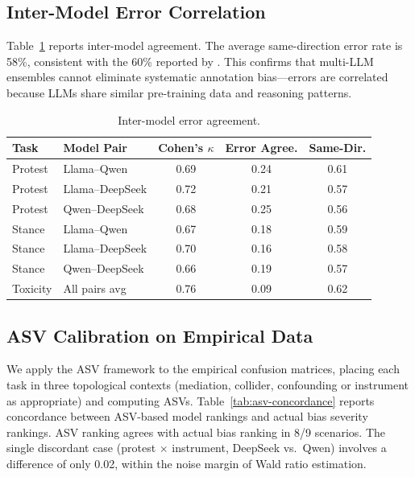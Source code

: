 \documentclass[11pt]{article}
\begin{document}
\subsection{Inter-Model Error Correlation}

Table~\ref{tab:inter-model} reports inter-model agreement.
The average same-direction error rate is 58\%, consistent with the 60\% reported by \citet{kim2025}.
This confirms that multi-LLM ensembles cannot eliminate systematic annotation bias---errors are correlated because LLMs share similar pre-training data and reasoning patterns.

\begin{table}[t]
\centering
\caption{Inter-model error agreement.}
\label{tab:inter-model}
\small
\begin{tabular}{llccc}
\toprule
Task & Model Pair & Cohen's $\kappa$ & Error Agree. & Same-Dir. \\
\midrule
Protest & Llama--Qwen     & 0.69 & 0.24 & 0.61 \\
Protest & Llama--DeepSeek  & 0.72 & 0.21 & 0.57 \\
Protest & Qwen--DeepSeek   & 0.68 & 0.25 & 0.56 \\
Stance  & Llama--Qwen     & 0.67 & 0.18 & 0.59 \\
Stance  & Llama--DeepSeek  & 0.70 & 0.16 & 0.58 \\
Stance  & Qwen--DeepSeek   & 0.66 & 0.19 & 0.57 \\
Toxicity& All pairs avg   & 0.76 & 0.09 & 0.62 \\
\bottomrule
\end{tabular}
\end{table}


\subsection{ASV Calibration on Empirical Data}

We apply the ASV framework to the empirical confusion matrices, placing each task in three topological contexts (mediation, collider, confounding or instrument as appropriate) and computing ASVs.
Table~\ref{tab:asv-concordance} reports concordance between ASV-based model rankings and actual bias severity rankings.
ASV ranking agrees with actual bias ranking in 8/9 scenarios.
The single discordant case (protest $\times$ instrument, DeepSeek vs.\ Qwen) involves a difference of only 0.02, within the noise margin of Wald ratio estimation.
\end{document}
